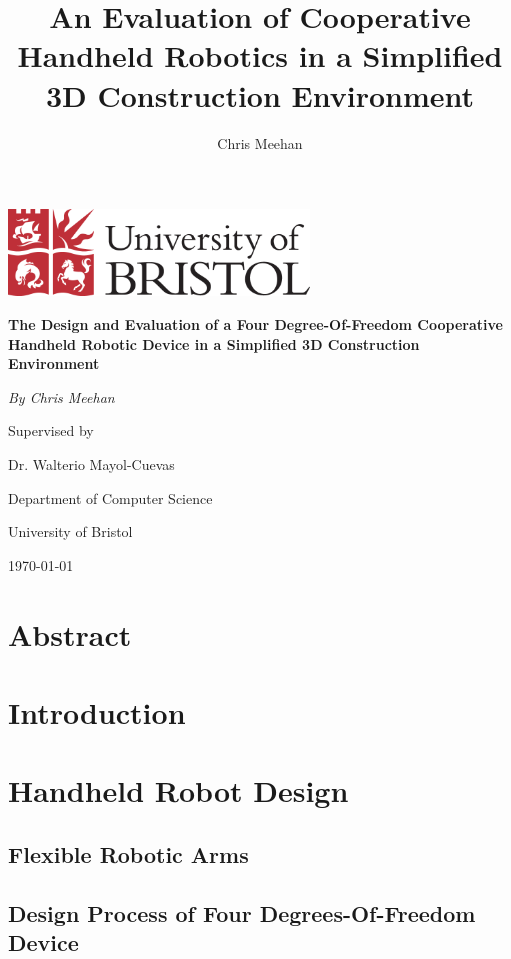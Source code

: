\documentclass[11pt]{article}
\title{An Evaluation of Cooperative Handheld Robotics in a Simplified 3D Construction Environment}
\author{Chris Meehan}
\begin{document}
\begin{titlepage}
	\centering
	
	\includegraphics[width=0.6\textwidth]{bristol.png}
	\vspace{2cm}

	{\huge\bfseries The Design and Evaluation of a Four Degree-Of-Freedom Cooperative Handheld Robotic Device in a Simplified 3D Construction Environment\par}
	\vspace{1.5cm}

	{\Large\itshape By Chris Meehan\par}
	
	Supervised by\par
	Dr. Walterio Mayol-Cuevas
	
	\vspace{1.5cm}
	
	Department of Computer Science\par
	University of Bristol

	\vfill

	{\large \today\par}
\end{titlepage}


\tableofcontents

\pagebreak

\section{Abstract}

\section{Introduction}

\section{Handheld Robot Design}
\subsection{Flexible Robotic Arms}
\subsection{Design Process of Four Degrees-Of-Freedom Device}
\end{document}
